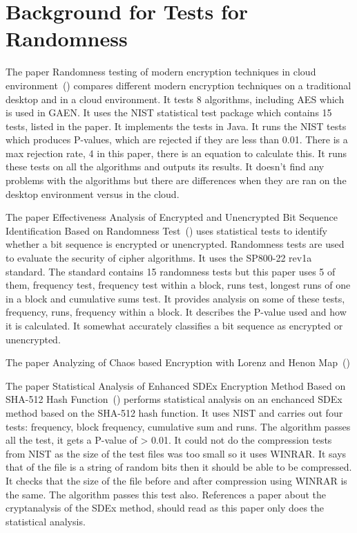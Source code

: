 \section{Background for Tests for Randomness}
\label{sec:BackgroundTests}

The paper Randomness testing of modern encryption techniques in cloud environment~(\cite{6236554}) compares different modern encryption techniques on a traditional desktop and in a cloud environment. It tests 8 algorithms, including AES which is used in GAEN. It uses the NIST statistical test package which contains 15 tests, listed in the paper. It implements the tests in Java. It runs the NIST tests which produces P-values, which are rejected if they are less than 0.01. There is a max rejection rate, 4 in this paper, there is an equation to calculate this. It runs these tests on all the algorithms and outputs its results. It doesn't find any problems with the algorithms but there are differences when they are ran on the desktop environment versus in the cloud. 

The paper Effectiveness Analysis of Encrypted and Unencrypted Bit Sequence Identification Based on Randomness Test~(\cite{7406118}) uses statistical tests to identify whether a bit sequence is encrypted or unencrypted. Randomness tests are used to evaluate the security of cipher algorithms. It uses the SP800-22 rev1a standard. The standard contains 15 randomness tests but this paper uses 5 of them, frequency test, frequency test within a block, runs test, longest runs of one in a block and cumulative sums test. It provides analysis on some of these tests, frequency, runs, frequency within a block. It describes the P-value used and how it is calculated. It somewhat accurately classifies a bit sequence as encrypted or unencrypted.

The paper Analyzing of Chaos based Encryption with Lorenz and Henon Map~(\cite{8653652})

The paper Statistical Analysis of Enhanced SDEx Encryption Method Based on SHA-512 Hash Function~(\cite{9209663}) performs statistical analysis on an enchanced SDEx method based on the SHA-512 hash function. It uses NIST and carries out four tests: frequency, block frequency, cumulative sum and runs. The algorithm passes all the test, it gets a P-value of > 0.01. It could not do the compression tests from NIST as the size of the test files was too small so it uses WINRAR. It says that of the file is a string of random bits then it should be able to be compressed. It checks that the size of the file before and after compression using WINRAR is the same. The algorithm passes this test also. References a paper about the cryptanalysis of the SDEx method, should read as this paper only does the statistical analysis.


